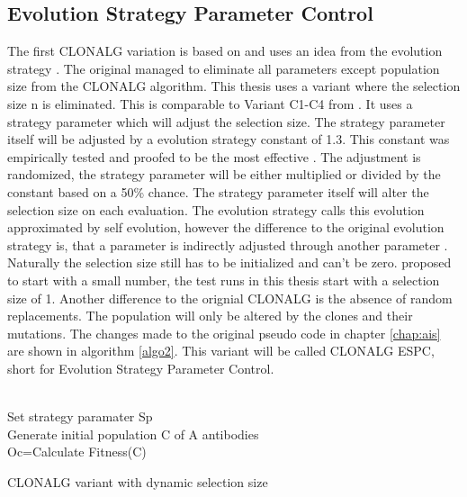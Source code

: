 \subsection{Evolution Strategy Parameter Control}
The first CLONALG variation is based on \cite{Garret04} and uses an idea from the evolution strategy \cite{evolution}. The original managed to eliminate all parameters except population size from the CLONALG algorithm. This thesis uses a variant where the selection size n is eliminated. This is comparable to Variant C1-C4 from \cite{Garret04}. It uses a strategy parameter which will adjust the selection size. The strategy parameter itself will be adjusted by a evolution strategy constant of 1.3. This constant was empirically tested and proofed to be the most effective \cite{Garret04}. The adjustment is randomized, the strategy parameter will be either multiplied or divided by the constant based on a 50\% chance. The strategy parameter itself will alter the selection size on each evaluation. The evolution strategy calls this evolution approximated by self evolution, however the difference to the original evolution strategy is, that a parameter is indirectly adjusted through another parameter \cite{Garret04}. Naturally the selection size still has to be initialized and can't be zero. \cite{Garret04} proposed to start with a small number, the test runs in this thesis start with a selection size of 1. Another difference to the orignial CLONALG is the absence of random replacements. The population will only be altered by the clones and their mutations. The changes made to the original pseudo code in chapter \ref{chap:ais} are shown in algorithm \ref{algo2}. This variant will be called CLONALG ESPC, short for Evolution Strategy Parameter Control.\\\\
\begin{algorithm}[H]
	Set strategy paramater Sp\\
	Generate initial population C of A antibodies\\
	Oc=Calculate Fitness(C)\\
	\caption{CLONALG variant with dynamic selection size}
	\label{algo2}
\end{algorithm}
